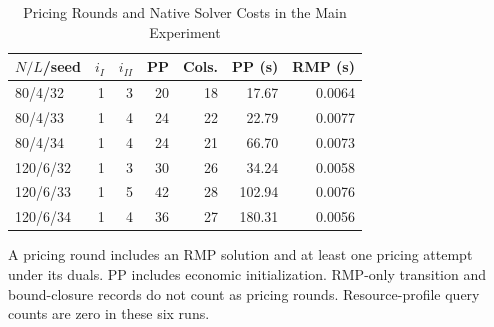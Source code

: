 \begin{table}[!t]
\caption{Pricing Rounds and Native Solver Costs in the Main Experiment}\label{tab:iterations}\centering\small
\setlength{\tabcolsep}{3pt}
\begin{tabular}{lrrrrrr}\toprule
$N/L$/seed & $i_I$ & $i_{II}$ & PP & Cols. & PP (s) & RMP (s)\\\midrule
80/4/32 & 1 & 3 & 20 & 18 & 17.67 & 0.0064\\
80/4/33 & 1 & 4 & 24 & 22 & 22.79 & 0.0077\\
80/4/34 & 1 & 4 & 24 & 21 & 66.70 & 0.0073\\
120/6/32 & 1 & 3 & 30 & 26 & 34.24 & 0.0058\\
120/6/33 & 1 & 5 & 42 & 28 & 102.94 & 0.0076\\
120/6/34 & 1 & 4 & 36 & 27 & 180.31 & 0.0056\\
\bottomrule\end{tabular}
\par\smallskip\begin{minipage}{\columnwidth}\footnotesize A pricing round includes an RMP solution and at least one pricing attempt under its duals. PP includes economic initialization. RMP-only transition and bound-closure records do not count as pricing rounds. Resource-profile query counts are zero in these six runs.\end{minipage}
\end{table}

